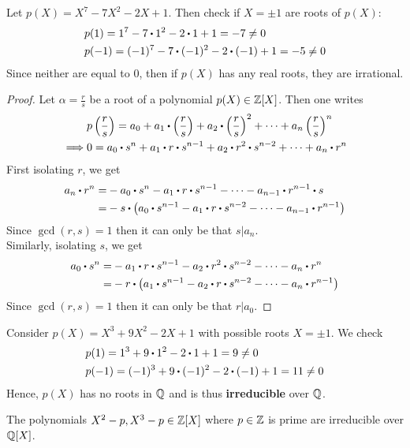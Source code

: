 \documentclass[../Main.tex]{subfiles}
\begin{document}
\begin{example}
	Let $p(X) = X^7-7X^2-2X+1$. Then check if $X=\pm 1$ are roots of $p(X)$:
	\begin{align*}
	&p(1)=1^7-7\rdot 1^2-2\rdot 1+1=-7\ne 0\\
	&p(-1)=(-1)^7-7\rdot (-1)^2-2\rdot (-1)+1=-5\ne 0
	\end{align*}
	Since neither are equal to $0$, then if $p(X)$ has any real roots, they are irrational.
\end{example}
\begin{proof}
	Let $\alpha=\frac{r}{s}$ be a root of a polynomial $p(X) \in \mathbb{Z}[X]$. Then one writes
	\begin{align*}
		&p\left(\frac{r}{s}\right)=a_0+a_1\rdot \left(\frac{r}{s}\right)+a_2\rdot \left(\frac{r}{s}\right)^2+\dots + a_n \left(\frac{r}{s}\right)^n\\
		\implies& 0 = a_0\rdot s^n +a_1\rdot r\rdot s^{n-1}+a_2\rdot r^2\rdot s^{n-2}+\dots+a_n\rdot r^n
	\end{align*}
	First isolating $r$, we get
	\begin{align*}
	a_n\rdot r^n =& -a_0 \rdot s^n-a_1\rdot r\rdot s^{n-1}-\dots-a_{n-1}\rdot r^{n-1}\rdot s \\
	=& -s \rdot \left(a_0\rdot s^{n-1}-a_1\rdot r\rdot s^{n-2}-\dots-a_{n-1}\rdot r^{n-1}\right)
	\end{align*}
	Since $\gcd(r,s)=1$ then it can only be that $s|a_n$.\\
	Similarly, isolating $s$, we get
	\begin{align*}
	a_0\rdot s^n =& -a_1\rdot r\rdot s^{n-1}-a_2\rdot r^2\rdot s^{n-2}-\dots-a_n\rdot r^n\\
	=& -r\rdot \left(a_1\rdot s^{n-1}-a_2\rdot r\rdot s^{n-2}-\dots-a_n\rdot r^{n-1}\right)
	\end{align*}
	Since $\gcd(r,s)=1$ then it can only be that $r|a_0$.
\end{proof}
\begin{example}
	Consider $p(X) = X^3+9X^2-2X+1$ with possible roots $X=\pm 1$. We check
	\begin{align*}
	&p(1)=1^3+9\rdot 1^2-2\rdot 1+1=9\ne 0\\
	&p(-1)=(-1)^3+9\rdot (-1)^2-2\rdot (-1)+1 = 11 \ne 0 
	\end{align*}
	Hence, $p(X)$ has no roots in $\mathbb{Q}$ and is thus \textbf{irreducible} over $\mathbb{Q}$.
\end{example}
\begin{claim}
	The polynomials $X^2-p,X^3-p \in \mathbb{Z}[X]$ where $p\in \mathbb{Z}$ is prime are irreducible over $\mathbb{Q}[X]$.
\end{claim}
\end{document}

